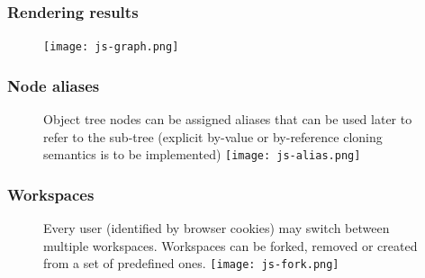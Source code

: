 \documentclass{beamer}
\begin{document}
\begin{frame}
\frametitle{Rendering results}
\begin{figure}[htbp]
\centering
\texttt{[image: js-graph.png]}
\end{figure}
\end{frame}

\begin{frame}
\frametitle{Node aliases}
\begin{figure}[htbp]
Object tree nodes can be assigned aliases that can be used later to refer to the sub-tree (explicit by-value or by-reference cloning semantics is to be implemented)
\centering
\texttt{[image: js-alias.png]}
\end{figure}
\end{frame}

\begin{frame}
\frametitle{Workspaces}
\begin{figure}[htbp]
Every user (identified by browser cookies) may switch between multiple workspaces. Workspaces can be forked, removed or created from a set of predefined ones.
\centering
\texttt{[image: js-fork.png]}
\end{figure}
\end{frame}
\end{document}
